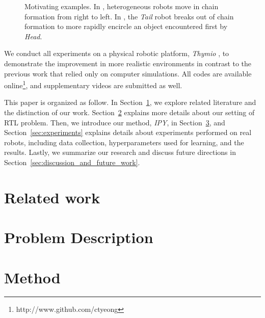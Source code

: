 \documentclass[letterpaper, 10 pt, conference]{ieeeconf}  %
\begin{document}
	\begin{figure}\centering
		\caption{Motivating examples.
			In \protect{}, heterogeneous robots move in
			chain formation from right to left. In
			\protect{}, the \emph{Tail} robot breaks
			out of chain formation to more rapidly encircle an object
			encountered first by \emph{Head}.
		}
		\label{fig:SampleChains}
	\end{figure}
	
	We conduct all experiments on a physical robotic platform,
	\emph{Thymio} \cite{Shin14}, to demonstrate the improvement in more realistic environments in 
	contrast to the previous work that relied only on computer simulations. 
	All codes are available online\footnote{http://www.github.com/ctyeong}, and supplementary videos 
	are submitted as well. 
		
	This paper is organized as follow. 
	In Section~\ref{sec:related_work}, we explore related literature and the distinction of our work. 
	Section~\ref{sec:problem_description} explains more details about our setting of RTL problem. 
	Then, we introduce our method, \emph{IPY}, in Section~\ref{sec:method}, and 
	Section~\ref{sec:experiments} explains details about experiments performed on real robots, 
	including data collection, hyperparameters used for learning, and the results. 
	Lastly, we summarize our research and discuss future directions 
	in Section~\ref{sec:discussion_and_future_work}.
	
	\section{Related work}
	\label{sec:related_work}
	
	\section{Problem Description} 
	\label{sec:problem_description}
	
	\section{Method}
	\label{sec:method}
	
\end{document}
